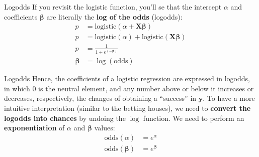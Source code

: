 \begin{frame}{Logodds}
	If you revisit the logistic function, you'll se that the intercept $\alpha$
	and coefficients $\boldsymbol{\beta}$ are literally the \textbf{log of the odds}
	(logodds):
	$$
		\begin{aligned}
			p                  & = \text{logistic}(\alpha +  \mathbf{X} \boldsymbol{\beta} )                 \\
			p                  & = \text{logistic}(\alpha) + \text{logistic}( \mathbf{X} \boldsymbol{\beta}) \\
			p                  & = \frac{1}{1 + e^{(-\boldsymbol{\beta})}}                                   \\
			\boldsymbol{\beta} & = \log(\text{odds})
		\end{aligned}
	$$
\end{frame}

\begin{frame}{Logodds}
	Hence, the coefficients of a logistic regression are expressed in logodds,
	in which $0$ is the neutral element,
	and any number above or below it increases or decreases, respectively,
	the changes of obtaining a ``success'' in $\mathbf{y}$.
	To have a more intuitive interpretation (similar to the betting houses),
	we need to \textbf{convert the logodds into chances} by undoing the $\log$ function.
	We need to perform an \textbf{exponentiation} of $\alpha$ and $\boldsymbol{\beta}$
	values:
	$$
		\begin{aligned}
			\text{odds}(\alpha)               & = e^\alpha               \\
			\text{odds}({\boldsymbol{\beta}}) & = e^{\boldsymbol{\beta}}
		\end{aligned}
	$$
\end{frame}
